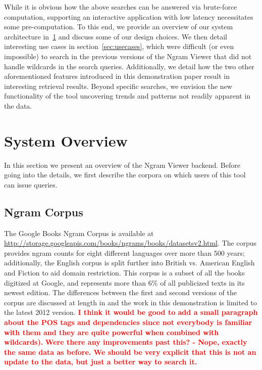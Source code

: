 \documentclass[11pt]{article}
\begin{document}
While it is obvious how the above searches can be answered via brute-force computation, supporting an interactive application with low latency necessitates some pre-computation. To this end, we provide an overview of our system architecture in~\ref{sec:overview} and discuss some of our design choices. We then detail interesting use cases in section~\ref{sec:usecases}, which were difficult (or even impossible) to search in the previous versions of the Ngram Viewer that did not handle wildcards in the search queries. Additionally, we detail how the two other aforementioned features introduced in this demonstration paper result in interesting retrieval results. Beyond specific searches, we envision the new functionality of the tool uncovering trends and patterns not readily apparent in the data.

\section{System Overview}
\label{sec:overview}

In this section we present an overview of the Ngram Viewer backend. Before going into the details, we first describe the corpora on which users of this tool can issue queries.

\subsection{Ngram Corpus}
The Google Books Ngram Corpus is available at \url{http://storage.googleapis.com/books/ngrams/books/datasetsv2.html}. The corpus provides ngram counts for eight different languages over more than 500 years; additionally, the English corpus is split further into British vs. American English and Fiction to aid domain restriction. This corpus is a subset of all the books digitized at Google, and represents more than 6\% of all publicized texts in its newest edition. The differences between the first and second versions of the corpus are discussed at length in  and the work in this demonstration is limited to the latest 2012 version.
\textcolor{red}{\bf I think it would be good to add a small paragraph about the POS tags and dependencies since not everybody is familiar with them and they are quite powerful when combined with wildcards).}
\textcolor{red}{\bf Were there any improvements past this? - Nope, exactly the same data as before. We should be very explicit that this is not an update to the data, but just a better way to search it.}
\end{document}
